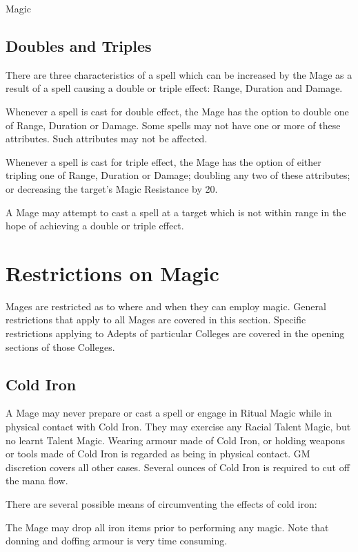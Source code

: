 \begin{Chapter}{Magic}
\subsection{Doubles and Triples}

There are three characteristics of a spell which can be increased by
the Mage as a result of a spell causing a double or triple effect:
Range, Duration and Damage.

Whenever a spell is cast for double effect, the Mage has the option to
double one of Range, Duration or Damage. Some spells may not have one
or more of these attributes. Such attributes may not be affected.

Whenever a spell is cast for triple effect, the Mage has the option of
either tripling one of Range, Duration or Damage; doubling any two of
these attributes; or decreasing the target’s Magic Resistance by 20.

A Mage may attempt to cast a spell at a target which is not within
range in the hope of achieving a double or triple effect.


\section{Restrictions on Magic}
\label{magic:restrictions}

Mages are restricted as to where and when they can employ
magic. General restrictions that apply to all Mages are covered in
this section. Specific restrictions applying to Adepts of particular
Colleges are covered in the opening sections of those Colleges.

\subsection{Cold Iron}

A Mage may never prepare or cast a spell or engage in Ritual Magic
while in physical contact with Cold Iron.  They may exercise any
Racial Talent Magic, but no learnt Talent Magic.  Wearing armour made
of Cold Iron, or holding weapons or tools made of Cold Iron is
regarded as being in physical contact.  GM discretion covers all other
cases.  Several ounces of Cold Iron is required to cut off the mana
flow.

There are several possible means of circumventing the effects of cold
iron:

\begin{Enumerate}

\item The Mage may drop all iron items prior to performing any
  magic. Note that donning and doffing armour is very time consuming.


\end{Enumerate}
\end{Chapter}
